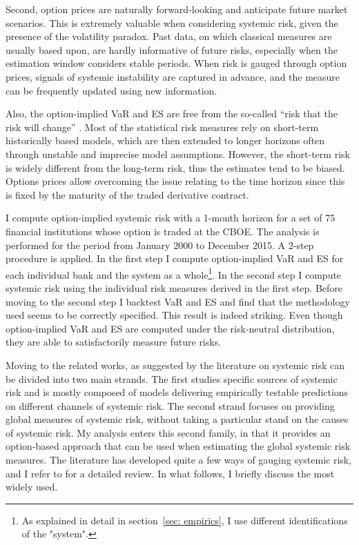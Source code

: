 \documentclass[11pt,a4paper,english]{article}
\begin{document}
Second, option prices are naturally forward-looking and anticipate future market scenarios. This is extremely valuable when considering systemic risk, given the presence of the volatility paradox. Past data, on which classical measures are usually based upon, are hardly informative of future risks, especially when the estimation window considers stable periods. When risk is gauged through option prices, signals of systemic instability are captured in advance, and the measure can be frequently updated using new information.

Also, the option-implied VaR and ES are free from the so-called “risk that the risk will change” \citep{Engle2009, Engle2011, Brownlees2011}. Most of the statistical risk measures rely on short-term historically based models, which are then extended to longer horizons often through unstable and imprecise model assumptions. However, the short-term risk is widely different from the long-term risk, thus the estimates tend to be biased. Options prices allow overcoming the issue relating to the time horizon since this is fixed by the maturity of the traded derivative contract. 

I compute option-implied systemic risk with a 1-month horizon for a set of 75 financial institutions whose option is traded at the CBOE. The analysis is performed for the period from January 2000 to December 2015. A 2-step procedure is applied. In the first step I compute option-implied VaR and ES for each individual bank and the system as a whole\footnote{As explained in detail in section~\ref{sec: empirics}, I use different identifications of the "system".}. In the second step I compute systemic risk using the individual risk measures derived in the first step. Before moving to the second step I backtest VaR and ES and find that the methodology used seems to be correctly specified. This result is indeed striking. Even though option-implied VaR and ES are computed under the risk-neutral distribution, they are able to satisfactorily measure future risks. 

Moving to the related works, as suggested by \citet{Benoit2016} the literature on systemic risk can be divided into two main strands. The first studies specific sources of systemic risk and is mostly composed of models delivering empirically testable predictions on different channels of systemic risk. The second strand focuses on providing global measures of systemic risk, without taking a particular stand on the causes of systemic risk. My analysis enters this second family, in that it provides an option-based approach that can be used when estimating the global systemic risk measures. The literature has developed quite a few ways of gauging systemic risk, and I refer to \citet{Benoit2016} for a detailed review. In what follows, I briefly discuss the most widely used. 
\end{document}
